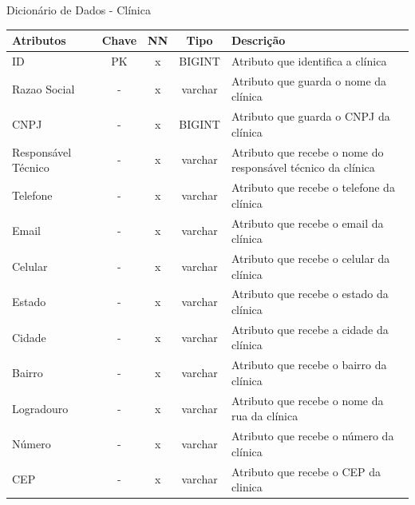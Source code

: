 \documentclass[
    12pt,               %
    openright,          %
    oneside,
    a4paper,            %
    BIBLATEX,           %
    TODO,               %
    english,            %
    brazil              %
    ]{ifsp-spo-inf-ctds}
\begin{document}
    \begin{center}
      \begin{quadro}[H]
      \centering
          \caption{Dicionário de Dados - Clínica}
          \begin{tabulary}{1.0\textwidth}{|p{9em}|c|c|c|p{19em}|}
        \hline
        Atributos & Chave & NN & Tipo & Descrição\\
        \hline
        ID & PK & x & BIGINT & Atributo que identifica a clínica \\
        \hline
        Razao Social & - & x & varchar & Atributo que guarda o nome da clínica\\
        \hline
        CNPJ & - & x & BIGINT & Atributo que guarda o CNPJ da clínica \\
        \hline
        Responsável Técnico & - & x & varchar & Atributo que recebe o nome do responsável técnico da clínica\\
        \hline
        Telefone & - & x & varchar & Atributo que recebe o telefone da clínica\\
        \hline
        Email & - & x & varchar & Atributo que recebe o email da clínica\\
        \hline
        Celular & - & x & varchar & Atributo que recebe o celular da clínica \\
        \hline
        Estado & - & x & varchar & Atributo que recebe o estado da clínica\\
        \hline
        Cidade & - & x & varchar & Atributo que recebe a cidade da clínica \\
        \hline
        Bairro & - & x & varchar & Atributo que recebe o bairro da clínica \\
        \hline
        Logradouro & - & x & varchar & Atributo que recebe o nome da rua da clínica\\
        \hline
        Número & - & x & varchar & Atributo que recebe o número da clínica \\
        \hline
        CEP & - & x & varchar &  Atributo que recebe o CEP da clinica\\
        \hline
        \end{tabulary}
         
          \label{qd: md-clinica}
      \end{quadro}
    \end{center}
    
\end{document}
